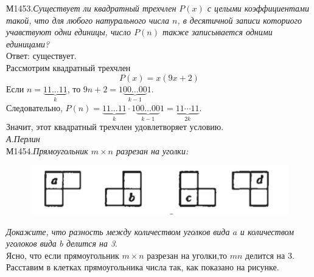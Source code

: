 \documentclass[russian,10pt,a4paper,twocolumn]{article}
\begin{document}
	\noindent
	М1453.{\slshape Существует ли квадратный трехчлен $P(x)$ с целыми коэффициентами такой, что для любого натурального числа $n$, в десятичной записи коториого учавствуют одни единицы, число $P(n)$ также записывается одними единицами?}\\
	Ответ: существует.\\
	Рассмотрим квадратный трехчлен
	\[
	P(x)=x(9x+2)
	\]
	Если $n = \underbrace{11\ldots11}_k$, то $9n+2=1\underbrace{00\ldots00}_{k-1} 1$.\\
	Следовательно, $P(n)=\underbrace{11\ldots11}_k \cdot 1\underbrace{00\ldots00}_{k-1}1=\underbrace{11\cdots11}_{2k}$.\\
	Значит, этот квадратный трехчлен удовлетворяет условию.\\
	{\slshape А.Перлин}\\
	
	\noindent
	М1454.{\slshape Прямоугольник $m \times n$ разрезан на уголки:}\\
	
	\begin{figure}[h]
		\centering
		\includegraphics[width=0.8\linewidth]{2}
	\end{figure}
	
	\noindent
	{\slshape Докажите, что разность между количеством уголков вида $a$ и количеством уголоков вида $b$ делится на 3}.\\
	
	\noindent
	Ясно, что если прямоугольник $m \times n$  разрезан на уголки,то $mn$ делится на 3. Расставим в клетках прямоугольника числа так, как показано на рисунке.\\
	\renewcommand{\arraystretch}{2}
	
	\noindent
	\\
\end{document}
